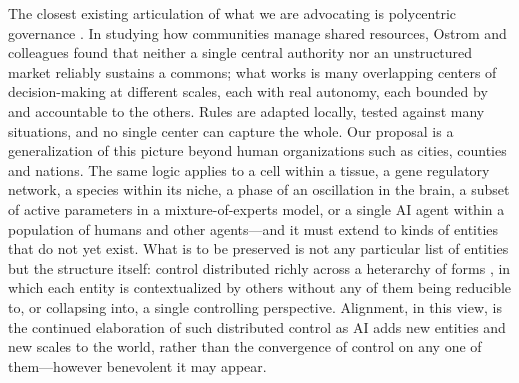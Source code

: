 The closest existing articulation of what we are advocating is polycentric governance \citep{ostrom1961organization, ostrom2010beyond}. In studying how communities manage shared resources, Ostrom and colleagues found that neither a single central authority nor an unstructured market reliably sustains a commons; what works is many overlapping centers of decision-making at different scales, each with real autonomy, each bounded by and accountable to the others. Rules are adapted locally, tested against many situations, and no single center can capture the whole. Our proposal is a generalization of this picture beyond human organizations such as cities, counties and nations. The same logic applies to a cell within a tissue, a gene regulatory network, a species within its niche, a phase of an oscillation in the brain, a subset of active parameters in a mixture-of-experts model, or a single AI agent within a population of humans and other agents---and it must extend to kinds of entities that do not yet exist. What is to be preserved is not any particular list of entities but the structure itself: control distributed richly across a heterarchy of forms \citep{mcculloch1945heterarchy}, in which each entity is contextualized by others without any of them being reducible to, or collapsing into, a single controlling perspective. Alignment, in this view, is the continued elaboration of such distributed control as AI adds new entities and new scales to the world, rather than the convergence of control on any one of them---however benevolent it may appear.
